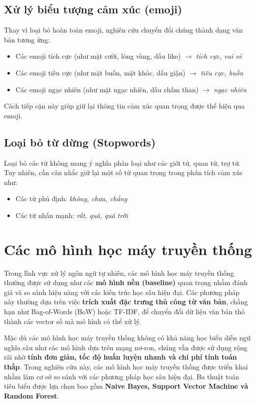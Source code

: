 \documentclass[14pt, a4paper]{report}
\begin{document}
\subsection{Xử lý biểu tượng cảm xúc (emoji)}

Thay vì loại bỏ hoàn toàn emoji, nghiên cứu chuyển đổi chúng thành dạng văn bản tương ứng:

\begin{itemize}
    \item Các emoji tích cực (như mặt cười, lòng vàng, dấu like) $\rightarrow$ \textit{tích cực, vui vẻ}
    \item Các emoji tiêu cực (như mặt buồn, mặt khóc, dấu giận) $\rightarrow$ \textit{tiêu cực, buồn}
    \item Các emoji ngạc nhiên (như mặt ngạc nhiên, dấu chấm than) $\rightarrow$ \textit{ngạc nhiên}
\end{itemize}

Cách tiếp cận này giúp giữ lại thông tin cảm xúc quan trọng được thể hiện qua emoji.

\subsection{Loại bỏ từ dừng (Stopwords)}

Loại bỏ các từ không mang ý nghĩa phân loại như các giới từ, quan từ, trợ từ. Tuy nhiên, cần cân nhắc giữ lại một số từ quan trọng trong phân tích cảm xúc như:

\begin{itemize}
    \item Các từ phủ định: \textit{không, chưa, chẳng}
    \item Các từ nhấn mạnh: \textit{rất, quá, quá trời}
\end{itemize}

\section{Các mô hình học máy truyền thống}

Trong lĩnh vực xử lý ngôn ngữ tự nhiên, các mô hình học máy truyền thống thường được sử dụng như các \textbf{mô hình nền (baseline)} quan trọng nhằm đánh giá và so sánh hiệu năng với các kiến trúc học sâu hiện đại. Các phương pháp này thường dựa trên việc \textbf{trích xuất đặc trưng thủ công từ văn bản}, chẳng hạn như Bag-of-Words (BoW) hoặc TF-IDF, để chuyển đổi dữ liệu văn bản thô thành các vector số mà mô hình có thể xử lý.

Mặc dù các mô hình học máy truyền thống không có khả năng học biểu diễn ngữ nghĩa sâu như các mô hình dựa trên mạng nơ-ron, chúng vẫn được sử dụng rộng rãi nhờ \textbf{tính đơn giản, tốc độ huấn luyện nhanh và chi phí tính toán thấp}. Trong nghiên cứu này, các mô hình học máy truyền thống được triển khai nhằm làm cơ sở so sánh với các phương pháp học sâu hiện đại. Ba thuật toán tiêu biểu được lựa chọn bao gồm \textbf{Naive Bayes, Support Vector Machine và Random Forest}.
\end{document}
